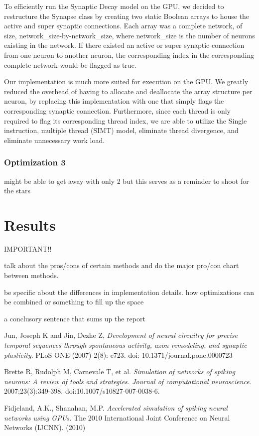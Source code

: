 \documentclass[a4paper]{article}
\begin{document}
To efficiently run the Synaptic Decay model on the GPU, we decided to restructure the Synapse class by creating two static Boolean arrays to house the active and super synaptic connections. Each array was a complete network, of size, network\_size-by-network\_size, where network\_size is the number of neurons existing in the network. If there existed an active or super synaptic connection from one neuron to another neuron, the corresponding index in the corresponding complete network would be flagged as true. 

Our implementation is much more suited for execution on the GPU. We greatly reduced the overhead of having to allocate and deallocate the array structure per neuron, by replacing this implementation with one that simply flags the corresponding synaptic connection.  Furthermore, since each thread is only required to flag its corresponding thread index, we are able to utilize the Single instruction, multiple thread (SIMT) model, eliminate thread divergence, and eliminate unnecessary work load.
\subsubsection{Optimization 3}

{\color{red} might be able to get away with only 2 but this serves as a reminder to shoot for the stars}


\section{Results}
{\huge \color{red} IMPORTANT!!}

{\color{red} talk about the pros/cons of certain methods and do the major pro/con chart between methods.}

{\color{red} be specific about the differences in implementation details. how optimizations can be combined or something to fill up the space}

{\color{red} a conclusory sentence that sums up the report}



\begin{thebibliography}{9}
Jun, Joseph K and Jin, Dezhe Z,
\emph{Development of neural circuitry for precise temporal sequences through spontaneous activity, axon remodeling, and synaptic plasticity}.
PLoS ONE (2007) 2(8): e723. doi: 10.1371/journal.pone.0000723

Brette R, Rudolph M, Carnevale T, et al.
\emph{Simulation of networks of spiking neurons: A review of tools and strategies. Journal of computational neuroscience.}
2007;23(3):349-398. doi:10.1007/s10827-007-0038-6.

Fidjeland, A.K.,  Shanahan, M.P.
\emph{Accelerated simulation of spiking neural networks using GPUs.}
The 2010 International Joint Conference on Neural Networks (IJCNN). (2010)
\end{thebibliography}
\end{document}
